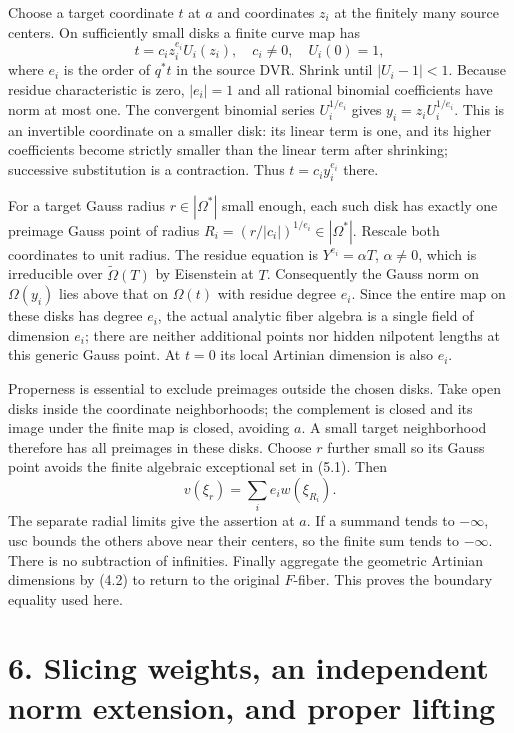 \documentclass[
  10pt,
]{article}
\begin{document}
Choose a target coordinate \(t\) at \(a\) and coordinates \(z_i\) at the
finitely many source centers. On sufficiently small disks a finite curve
map has \[t=c_i z_i^{e_i}U_i(z_i),\quad c_i\ne0,\quad U_i(0)=1,\] where
\(e_i\) is the order of \(q^*t\) in the source DVR. Shrink until
\(|U_i-1|<1\). Because residue characteristic is zero, \(|e_i|=1\) and
all rational binomial coefficients have norm at most one. The convergent
binomial series \(U_i^{1/e_i}\) gives \(y_i=z_iU_i^{1/e_i}\). This is an
invertible coordinate on a smaller disk: its linear term is one, and its
higher coefficients become strictly smaller than the linear term after
shrinking; successive substitution is a contraction. Thus
\(t=c_i y_i^{e_i}\) there.

For a target Gauss radius \(r\in|\Omega^*|\) small enough, each such
disk has exactly one preimage Gauss point of radius
\(R_i=(r/|c_i|)^{1/e_i}\in|\Omega^*|\). Rescale both coordinates to unit
radius. The residue equation is \(Y^{e_i}=\alpha T\), \(\alpha\ne0\),
which is irreducible over \(\widetilde\Omega(T)\) by Eisenstein at
\(T\). Consequently the Gauss norm on \(\Omega(y_i)\) lies above that on
\(\Omega(t)\) with residue degree \(e_i\). Since the entire map on these
disks has degree \(e_i\), the actual analytic fiber algebra is a single
field of dimension \(e_i\); there are neither additional points nor
hidden nilpotent lengths at this generic Gauss point. At \(t=0\) its
local Artinian dimension is also \(e_i\).

Properness is essential to exclude preimages outside the chosen disks.
Take open disks inside the coordinate neighborhoods; the complement is
closed and its image under the finite map is closed, avoiding \(a\). A
small target neighborhood therefore has all preimages in these disks.
Choose \(r\) further small so its Gauss point avoids the finite
algebraic exceptional set in (5.1). Then
\[v(\xi_r)=\sum_i e_i w(\xi_{R_i}).\] The separate radial limits give
the assertion at \(a\). If a summand tends to \(-\infty\), usc bounds
the others above near their centers, so the finite sum tends to
\(-\infty\). There is no subtraction of infinities. Finally aggregate
the geometric Artinian dimensions by (4.2) to return to the original
\(F\)-fiber. This proves the boundary equality used here.

\section{6. Slicing weights, an independent norm extension, and proper
lifting}\label{slicing-weights-an-independent-norm-extension-and-proper-lifting}
\end{document}
